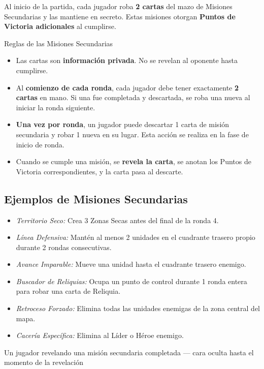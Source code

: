 Al inicio de la partida, cada jugador roba \textbf{2 cartas} del mazo de Misiones Secundarias y las mantiene en secreto. Estas misiones otorgan \textbf{Puntos de Victoria adicionales} al cumplirse.

\begin{reglaespecial}{Reglas de las Misiones Secundarias}
\begin{itemize}
    \item Las cartas son \textbf{información privada}. No se revelan al oponente hasta cumplirse.
    \item Al \textbf{comienzo de cada ronda}, cada jugador debe tener exactamente \textbf{2 cartas} en mano. Si una fue completada y descartada, se roba una nueva al iniciar la ronda siguiente.
    \item \textbf{Una vez por ronda}, un jugador puede descartar 1 carta de misión secundaria y robar 1 nueva en su lugar. Esta acción se realiza en la fase de inicio de ronda.
    \item Cuando se cumple una misión, se \textbf{revela la carta}, se anotan los Puntos de Victoria correspondientes, y la carta pasa al descarte.
\end{itemize}
\end{reglaespecial}

\subsection*{Ejemplos de Misiones Secundarias}

\begin{itemize}
    \item \textit{Territorio Seco:} Crea 3 Zonas Secas antes del final de la ronda 4.
    \item \textit{Línea Defensiva:} Mantén al menos 2 unidades en el cuadrante trasero propio durante 2 rondas consecutivas.
    \item \textit{Avance Imparable:} Mueve una unidad hasta el cuadrante trasero enemigo.
    \item \textit{Buscador de Reliquias:} Ocupa un punto de control durante 1 ronda entera para robar una carta de Reliquia.
    \item \textit{Retroceso Forzado:} Elimina todas las unidades enemigas de la zona central del mapa.
    \item \textit{Cacería Específica:} Elimina al Líder o Héroe enemigo.
\end{itemize}

\begin{imagebox}{Un jugador revelando una misión secundaria completada — cara oculta hasta el momento de la revelación}
    \vspace{2cm}
\end{imagebox}

